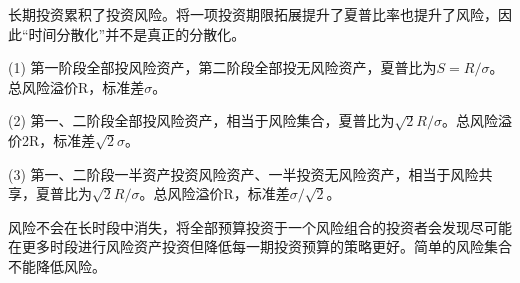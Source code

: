\documentclass{article}
\begin{document}
长期投资累积了投资风险。将一项投资期限拓展提升了夏普比率也提升了风险，因此“时间分散化”并不是真正的分散化。

(1) 第一阶段全部投风险资产，第二阶段全部投无风险资产，夏普比为$ S=R/\sigma $。总风险溢价R，标准差$ \sigma $。

(2) 第一、二阶段全部投风险资产，相当于风险集合，夏普比为$ \sqrt{2}R/\sigma $。总风险溢价2R，标准差$ \sqrt{2}\sigma $。

(3) 第一、二阶段一半资产投资风险资产、一半投资无风险资产，相当于风险共享，夏普比为$ \sqrt{2}R/\sigma $。总风险溢价R，标准差$ \sigma/\sqrt{2} $。

\hspace*{\fill}

风险不会在长时段中消失，将全部预算投资于一个风险组合的投资者会发现尽可能在更多时段进行风险资产投资但降低每一期投资预算的策略更好。简单的风险集合不能降低风险。
\end{document}
